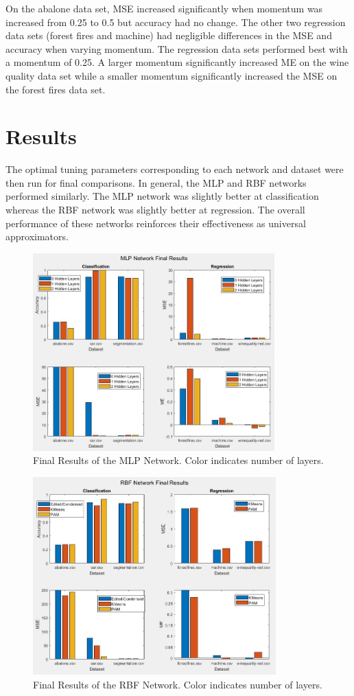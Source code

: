 \documentclass[twoside,10pt]{article}
\begin{document}
On the abalone data set, MSE increased significantly when momentum was increased from 0.25 to 0.5 but accuracy had no change. The other two regression data sets (forest fires and machine) had negligible differences in the MSE and accuracy when varying momentum. The regression data sets performed best with a momentum of 0.25. A larger momentum significantly increased ME on the wine quality data set while a smaller momentum significantly increased the MSE on the forest fires data set.
\section{Results}

	The optimal tuning parameters corresponding to each network and dataset were then run for final comparisons. In general, the MLP and RBF networks performed similarly. The MLP network was slightly better at classification whereas the RBF network was slightly better at regression. The overall performance of these networks reinforces their effectiveness as universal approximators.

\begin{figure}[h]
	\centering
	\includegraphics[height=3in]{FINAL_FIGS/MLP_FINAL.JPG}
	\caption{Final Results of the MLP Network. Color indicates number of layers.}
\end{figure}
\begin{figure}[h]
	\centering
	\includegraphics[height=3in]{FINAL_FIGS/RBF_FINAL.JPG}
	\caption{Final Results of the RBF Network. Color indicates number of layers.}
\end{figure}
\end{document}
